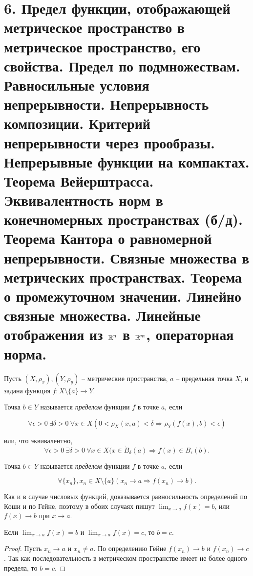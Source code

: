 \section{6. Предел функции, отображающей метрическое пространство в метрическое пространство, его свойства. Предел по подмножествам. Равносильные условия непрерывности. Непрерывность композиции. Критерий непрерывности через прообразы. Непрерывные функции на компактах. Теорема Вейерштрасса. Эквивалентность норм в конечномерных пространствах (б/д). Теорема Кантора о равномерной непрерывности. Связные множества в метрических пространствах. Теорема о промежуточном значении. Линейно связные множества. Линейные отображения из $\mathbb{R}^n$ в $\mathbb{R}^m$, операторная норма.}

Пусть $(X, \rho_{x}), (Y, \rho_{y})$ -- метрические пространства, $a$ -- предельная точка $X$, и задана функция $f: X \setminus \{a\} \to Y$.

\begin{definition}[Коши]
    Точка $b \in Y$ называется \textit{пределом} функции $f$ в точке $a$, если
    
    \[\forall \epsilon > 0 \ \exists \delta > 0 \ \forall x \in X (0 < \rho_{X}(x, a) < \delta \Rightarrow \rho_{Y}(f(x), b) < \epsilon)\]
    
    или, что эквивалентно,
    \[\forall \epsilon > 0 \ \exists \delta > 0 \ \forall x \in X (x \in \mathring{B}_{\delta}(a) \Rightarrow f(x) \in B_{\epsilon}(b).\]
\end{definition}

\begin{definition}[Гейне]
    Точка $b \in Y$ называется \textit{пределом} функции $f$ в точке $a$, если
    
    \[\forall \{x_{n}\}, x_{n} \in X \setminus \{a\} (x_{n} \to a \Rightarrow f(x_{n}) \to b).\]
    
\end{definition}

Как и в случае числовых функций, доказывается равносильность определений по Коши и по Гейне, поэтому в обоих случаях пишут $\lim_{x \to a}f(x) = b$, или $f(x) \to b$ при $x \to a$.

\begin{property}[единственность]
    Если $\lim_{x \to a}f(x) = b$ и $\lim_{x \to a}f(x) = c$, то $b = c$.
\end{property}

\begin{proof}
    Пусть $x_{n} \to a$ и $x_{n} \neq a$. По определению Гейне $f(x_{n}) \to b$ и $f(x_{n}) \to c$. Так как последовательность в метрическом пространстве имеет не более одного предела, то $b = c$.
\end{proof}

